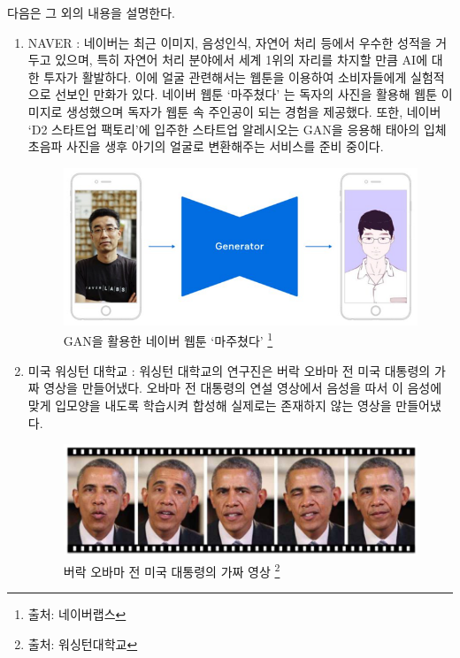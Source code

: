 \documentclass[chapter,oneside]{oblivoir}
\begin{document}
다음은 그 외의 내용을 설명한다.
\begin{enumerate}%

\item NAVER : 네이버는 최근 이미지, 음성인식, 자연어 처리 등에서 우수한 성적을 거두고 있으며, 특히 자연어 처리 분야에서 세계 1위의 자리를 차지할 만큼 AI에 대한 투자가 활발하다. 이에 얼굴 관련해서는 웹툰을 이용하여 소비자들에게 실험적으로 선보인 만화가 있다. 네이버 웹툰 ‘마주쳤다’ 는 독자의 사진을 활용해 웹툰 이미지로 생성했으며 독자가 웹툰 속 주인공이 되는 경험을 제공했다. 또한, 네이버 ‘D2 스타트업 팩토리’에 입주한 스타트업 알레시오는 GAN을 응용해 태아의 입체 초음파 사진을 생후 아기의 얼굴로 변환해주는 서비스를 준비 중이다.

\begin{figure}[h!]
    \centering
      \includegraphics[scale = 0.5]{pic/chp1/imgnaver}
    \caption{ GAN을 활용한 네이버 웹툰 ‘마주쳤다’ \protect\footnote{출처: 네이버랩스}}
\end{figure}


\item 미국 워싱턴 대학교 : 워싱턴 대학교의 연구진은 버락 오바마 전 미국 대통령의 가짜 영상을 만들어냈다. 오바마 전 대통령의 연설 영상에서 음성을 따서 이 음성에 맞게 입모양을 내도록 학습시켜 합성해 실제로는 존재하지 않는 영상을 만들어냈다. 

\begin{figure}[h!]
    \centering
      \includegraphics[scale = 0.5]{pic/chp1/img612}
    \caption{  버락 오바마 전 미국 대통령의 가짜 영상 \protect\footnote{출처: 워싱턴대학교}}
\end{figure}



\end{enumerate}
\end{document}
